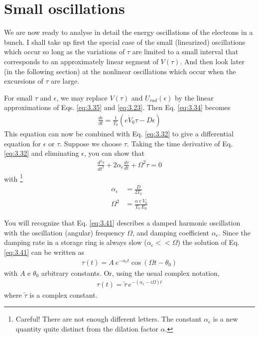 \section{Small oscillations}\label{sec:3.5}
We are now ready to analyse in detail the energy oscillations of the electrons in a bunch. I shall take up first the special case of the small (linearized) oscillations which occur so long as the variations of $\tau$ are limited to a small interval that corresponds to an approximately linear segment of $V(\tau)$. And then look later (in the following section) at the nonlinear oscillations which occur when the excursions of $\tau$ are large.

For small $\tau$ and $\epsilon$, we may replace $V(\tau)$ and $U_{rad}(\epsilon)$ by the linear approximations of Eqs. \eqref{eq:3.35} and \eqref{eq:3.23}. Then Eq. \eqref{eq:3.34} becomes
\begin{align}
	\frac{d\epsilon}{dt} = \frac{1}{T_0}(e\dot{V}_0 \tau - D\epsilon)\label{eq:3.40}
\end{align}
This equation can now be combined with Eq. \eqref{eq:3.32} to give a differential equation for $\epsilon$ or $\tau$. Suppose we choose $\tau$. Taking the time derivative of Eq. \eqref{eq:3.32} and eliminating $\epsilon$, you can show that
\begin{align}
	\frac{d^2 \tau}{dt^2} + 2\alpha_\epsilon \frac{d\tau}{dt} + \Omega^2 \tau = 0\label{eq:3.41}
\end{align}
with \footnote{Careful! There are not enough different letters. The constant $\alpha_\epsilon$ is a new quantity quite distinct from the dilation factor $\alpha$.}
\begin{align}
	\alpha_\epsilon &= \frac{D}{2 T_0}\\
	\Omega^2 &= \frac{\alpha\ e\ \dot{V}_0}{T_0\ E_0} \label{eq:3.43}
\end{align}

You will recognize that Eq. \eqref{eq:3.41} describes a damped harmonic oscillation with the oscillation (angular) frequency $\Omega$, and damping coefficient $\alpha_\epsilon$. Since the damping rate in a storage ring is always slow ($\alpha_\epsilon << \Omega$) the solution of Eq. \eqref{eq:3.41} can be written as
\begin{align} \label{eq:3.44}
	\tau(t) = A\ e^{-\alpha_\epsilon t} \cos(\Omega t - \theta_0)
\end{align}
with $A$ e $\theta_0$ arbitrary constants. Or, using the usual complex notation,
\begin{align}
	\tau(t) = \tilde{\tau}\ e^{-(\alpha_\epsilon - i\Omega)t}
\end{align}
where $\tilde{\tau}$ is a complex constant.

